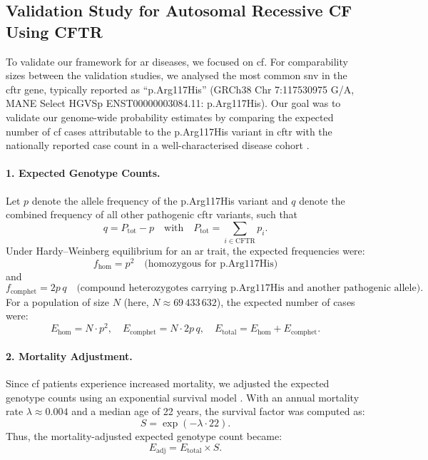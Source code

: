 \subsection{Validation Study for Autosomal Recessive CF Using CFTR}

To validate our framework for \ac{ar} diseases, we focused on \ac{cf}.
For comparability sizes between the validation studies, we analysed the most common \ac{snv} in the \ac{cftr} gene, typically reported as ``p.Arg117His'' (GRCh38 Chr 7:117530975 G/A, MANE Select HGVSp ENST00000003084.11: p.Arg117His).
Our goal was to validate our genome-wide probability estimates by comparing the expected number of \ac{cf} cases attributable to the p.Arg117His variant in \ac{cftr} with the nationally reported case count in a well-characterised disease cohort
\cite{naito2023uk, castellani2013cftr2, Grasemann2023cftr}.

\paragraph{1. Expected Genotype Counts.}
Let \( p \) denote the allele frequency of the p.Arg117His variant and \( q \) denote the combined frequency of all other pathogenic \ac{cftr} variants, such that
\[
q = P_{\text{tot}} - p \quad \text{with} \quad P_{\text{tot}} = \sum_{i \in \text{CFTR}} p_i.
\]
Under Hardy–Weinberg equilibrium for an \ac{ar} trait, the expected frequencies were:
\[
f_{\text{hom}} = p^2 \quad \text{(homozygous for p.Arg117His)}
\]
and
\[
f_{\text{comphet}} = 2p\,q \quad \text{(compound heterozygotes carrying p.Arg117His and another pathogenic allele)}.
\]
For a population of size \( N \) (here, \( N \approx 69\,433\,632 \)), the expected number of cases were:
\[
E_{\text{hom}} = N \cdot p^2,\quad E_{\text{comphet}} = N \cdot 2p\,q,\quad E_{\text{total}} = E_{\text{hom}} + E_{\text{comphet}}.
\]

\paragraph{2. Mortality Adjustment.}
Since \ac{cf} patients experience increased mortality, we adjusted the expected genotype counts using an exponential survival model \cite{naito2023uk, castellani2013cftr2, Grasemann2023cftr}. With an annual mortality rate \(\lambda \approx 0.004\) and a median age of 22 years, the survival factor was computed as:
\[
S = \exp(-\lambda \cdot 22).
\]
Thus, the mortality-adjusted expected genotype count became:
\[
E_{\text{adj}} = E_{\text{total}} \times S.
\]

